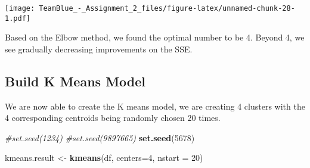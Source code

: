 \documentclass[]{article}
\newenvironment{Shaded}{\begin{snugshade}}{\end{snugshade}}
\newcommand{\KeywordTok}[1]{\textcolor[rgb]{0.13,0.29,0.53}{\textbf{#1}}}
\newcommand{\DataTypeTok}[1]{\textcolor[rgb]{0.13,0.29,0.53}{#1}}
\newcommand{\DecValTok}[1]{\textcolor[rgb]{0.00,0.00,0.81}{#1}}
\newcommand{\StringTok}[1]{\textcolor[rgb]{0.31,0.60,0.02}{#1}}
\newcommand{\CommentTok}[1]{\textcolor[rgb]{0.56,0.35,0.01}{\textit{#1}}}
\newcommand{\ControlFlowTok}[1]{\textcolor[rgb]{0.13,0.29,0.53}{\textbf{#1}}}
\newcommand{\OperatorTok}[1]{\textcolor[rgb]{0.81,0.36,0.00}{\textbf{#1}}}
\newcommand{\NormalTok}[1]{#1}
\begin{document}
\begin{Shaded}
\end{Shaded}

\texttt{[image: TeamBlue\_-\_Assignment\_2\_files/figure-latex/unnamed-chunk-28-1.pdf]}

Based on the Elbow method, we found the optimal number to be 4. Beyond
4, we see gradually decreasing improvements on the SSE.

\subsection{Build K Means Model}\label{build-k-means-model}

We are now able to create the K means model, we are creating 4 clusters
with the 4 corresponding centroids being randomly chosen 20 times.

\begin{Shaded}
\begin{Highlighting}[]
\CommentTok{#set.seed(1234)}
\CommentTok{#set.seed(9897665)}
\KeywordTok{set.seed}\NormalTok{(}\DecValTok{5678}\NormalTok{)}

\NormalTok{kmeans.result <-}\StringTok{ }\KeywordTok{kmeans}\NormalTok{(df, }\DataTypeTok{centers=}\DecValTok{4}\NormalTok{, }\DataTypeTok{nstart =} \DecValTok{20}\NormalTok{)}
\end{Highlighting}
\end{Shaded}
\end{document}

